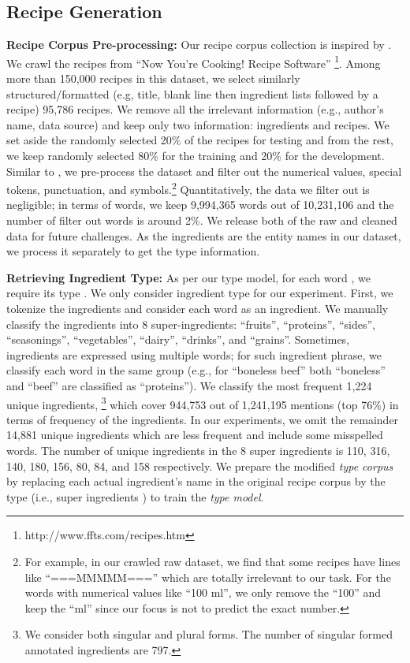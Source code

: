 \documentclass[11pt,a4paper]{article}
\begin{document}
\subsection{Recipe Generation}
\label{recipe_gen}
\textbf{ Recipe Corpus Pre-processing:} Our recipe corpus collection is inspired by \cite{recipe_checklist}. We crawl the recipes from ``Now You’re Cooking! Recipe Software'' \footnote{http://www.ffts.com/recipes.htm}. Among more than 150,000 recipes  in this dataset, we select similarly  structured/formatted (e.g, title, blank line then ingredient lists followed by a recipe) 95,786 recipes. We remove all the irrelevant  information (e.g., author's name, data source) and keep only two information: ingredients and recipes.  We set aside the randomly selected 20\% of the recipes for testing and from the rest, we keep randomly selected 80\% for the training and 20\% for the development.  Similar to \cite{recipe_checklist},  we pre-process the  dataset and  filter out the numerical values, special tokens, punctuation, and symbols.\footnote{For example, in our crawled raw dataset, we find that some recipes have lines like ``===MMMMM==='' which are totally irrelevant to our task. For the words with numerical values like ``100 ml'', we only remove the ``100'' and keep the ``ml'' since our focus is not to predict the exact number.}  Quantitatively, the data we filter out is negligible; in terms of words, we keep 9,994,365 words out of 10,231,106 and the number of filter out words is around 2\%. We release both of the raw and cleaned data for future challenges. As the ingredients are the entity names in our dataset, we process it separately to get the type information.

\textbf{Retrieving Ingredient Type:} As per our type model, for each word , we require its type . We only consider ingredient type for our experiment. First, we tokenize the ingredients and consider each word as an ingredient. We manually classify the ingredients into 8 super-ingredients: ``fruits'', ``proteins'', ``sides'', ``seasonings'', ``vegetables'', ``dairy'', ``drinks'', and ``grains''. Sometimes, ingredients are expressed using multiple words; for such ingredient phrase, we classify each word in the same group (e.g., for ``boneless beef'' both ``boneless'' and ``beef'' are classified as ``proteins''). We classify the most frequent 1,224 unique ingredients, \footnote{We consider both singular and plural forms. The number of singular formed annotated ingredients are 797.}  which cover 944,753  out of  1,241,195 mentions (top 76\%) in terms of frequency of the ingredients. In our experiments, we omit the remainder 14,881 unique ingredients which are less frequent and include some misspelled words. The number of unique ingredients in the 8 super ingredients is 110, 316, 140, 180, 156, 80, 84, and  158 respectively.  We prepare the modified {\it type corpus} by replacing each actual ingredient's name  in the original recipe corpus by the type (i.e., super ingredients  ) to train the {\it type model}.
\end{document}
